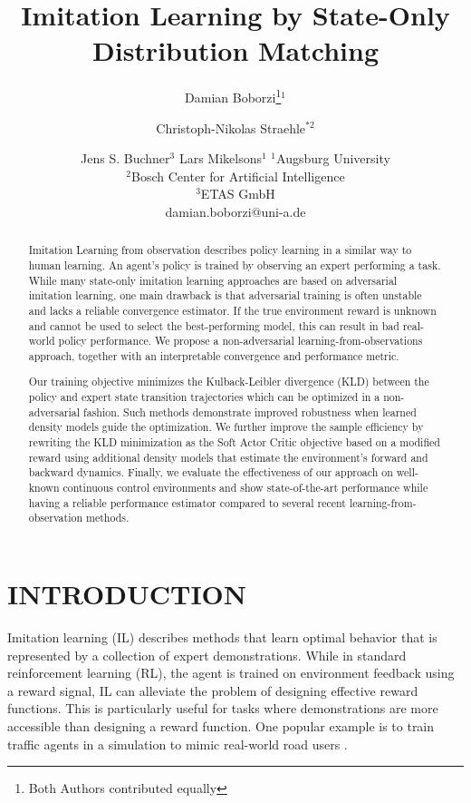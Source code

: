 \documentclass{article}
\title{Imitation Learning by State-Only Distribution Matching}
\author{
Damian Boborzi\footnote{Both Authors contributed equally}$^{1}$
\and
Christoph-Nikolas Straehle$^{*2}$\and
Jens S. Buchner$^{3}$\And
Lars Mikelsons$^1$
\affiliations
$^1$Augsburg University\\
$^2$Bosch Center for Artificial Intelligence\\
$^3$ETAS GmbH\\
\emails
damian.boborzi@uni-a.de
}
\begin{document}
\maketitle

\begin{abstract}
Imitation Learning from observation describes policy learning in a similar way to human learning. An agent's policy is trained by observing an expert performing a task. While many state-only imitation learning approaches are based on adversarial imitation learning, one main drawback is that adversarial training is often unstable and lacks a reliable convergence estimator. If the true environment reward is unknown and cannot be used to select the best-performing model, this can result in bad real-world policy performance. We propose a non-adversarial learning-from-observations approach, together with an interpretable convergence and performance metric. 

Our training objective minimizes the Kulback-Leibler divergence (KLD) between the policy and expert state transition trajectories which can be optimized in a non-adversarial fashion. Such methods demonstrate improved robustness when learned density models guide the optimization. We further improve the sample efficiency by rewriting the KLD minimization as the Soft Actor Critic objective based on a modified reward using additional density models that estimate the environment's forward and backward dynamics. Finally, we evaluate the effectiveness of our approach on well-known continuous control environments and show state-of-the-art performance while having a reliable performance estimator compared to several recent learning-from-observation methods.
\end{abstract}

\section{INTRODUCTION}

Imitation learning (IL) describes methods that learn optimal behavior that is represented by a collection of expert demonstrations. While in standard reinforcement learning (RL), the agent is trained on environment feedback using a reward signal, IL can alleviate the problem of designing effective reward functions. This is particularly useful for tasks where demonstrations are more accessible than designing a reward function. One popular example is to train traffic agents in a simulation to mimic real-world road users \cite{kuefler2017imitating}. 
\end{document}
